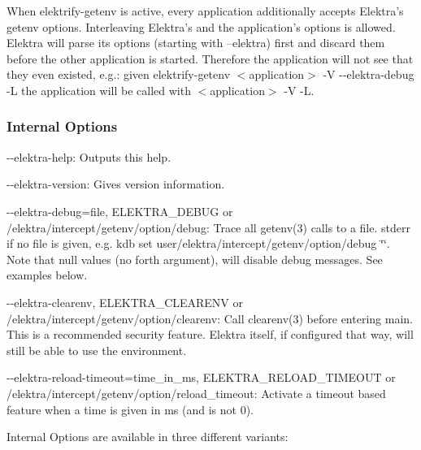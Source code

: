 When {\ttfamily elektrify-\/getenv} is active, every application additionally accepts Elektra's getenv options. Interleaving Elektra's and the application's options is allowed. Elektra will parse its options (starting with --elektra) first and discard them before the other application is started. Therefore the application will not see that they even existed, e.\+g.\+: given {\ttfamily elektrify-\/getenv $<$application$>$ -\/\+V -\/-\/elektra-\/debug -\/\+L} the application will be called with {\ttfamily $<$application$>$ -\/\+V -\/\+L}.

\subsubsection*{Internal Options}


\begin{DoxyItemize}
\item {\ttfamily -\/-\/elektra-\/help}\+: Outputs this help.
\item {\ttfamily -\/-\/elektra-\/version}\+: Gives version information.
\item {\ttfamily -\/-\/elektra-\/debug=file}, {\ttfamily E\+L\+E\+K\+T\+R\+A\+\_\+\+D\+E\+B\+U\+G} or {\ttfamily /elektra/intercept/getenv/option/debug}\+: Trace all getenv(3) calls to a file. stderr if no file is given, e.\+g. {\ttfamily kdb set user/elektra/intercept/getenv/option/debug \char`\"{}\char`\"{}}. Note that null values (no forth argument), will disable debug messages. See examples below.
\item {\ttfamily -\/-\/elektra-\/clearenv}, {\ttfamily E\+L\+E\+K\+T\+R\+A\+\_\+\+C\+L\+E\+A\+R\+E\+N\+V} or {\ttfamily /elektra/intercept/getenv/option/clearenv}\+: Call clearenv(3) before entering main. This is a recommended security feature. Elektra itself, if configured that way, will still be able to use the environment.
\item {\ttfamily -\/-\/elektra-\/reload-\/timeout=time\+\_\+in\+\_\+ms}, {\ttfamily E\+L\+E\+K\+T\+R\+A\+\_\+\+R\+E\+L\+O\+A\+D\+\_\+\+T\+I\+M\+E\+O\+U\+T} or {\ttfamily /elektra/intercept/getenv/option/reload\+\_\+timeout}\+: Activate a timeout based feature when a time is given in ms (and is not 0).
\end{DoxyItemize}

Internal Options are available in three different variants\+:


